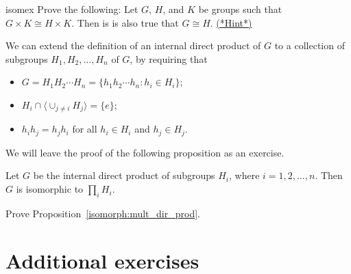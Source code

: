 \begin{exercise}{isomex}
Prove the following: Let $G$, $H$, and $K$ be
groups such that $G \times K \cong H \times K$. Then is is also true that $G \cong H$. 
\hyperref[sec:isomorph:hints]{(*Hint*)}
\end{exercise}

We can extend the definition of an internal direct product of $G$ to a
collection of subgroups $H_1, H_2, \ldots, H_n$ of $G$, by requiring
that 
\begin{itemize}
 
\item
$G = H_1 H_2 \cdots H_n = \{ h_1 h_2 \cdots h_n : h_i \in H_i \}$;
 
\item
$H_i \cap \langle \cup_{j \neq i} H_j \rangle = \{ e \}$;
 
\item
$h_i h_j = h_j h_i$ for all $h_i \in H_i$ and $h_j \in H_j$.
 
\end{itemize}
We will leave the proof of the following proposition as an exercise. 
 
\begin{thm}\label{isomorph:mult_dir_prod}
Let $G$ be the internal direct product of subgroups $H_i$, where $i =
1, 2, \ldots, n$. Then $G$ is isomorphic to $\prod_i H_i$. 
\end{thm}

\begin{exercise}{}
Prove Proposition~\ref{isomorph:mult_dir_prod}.
\end{exercise}
 


 
\section*{Additional exercises}
\exrule

 
 
